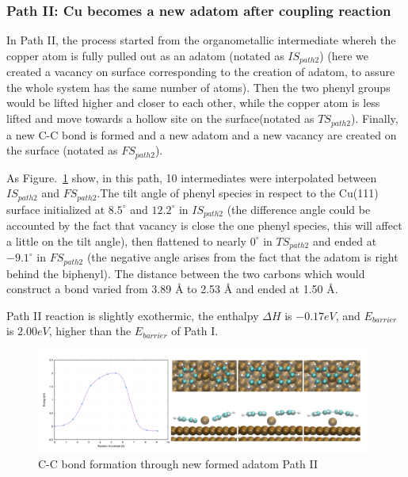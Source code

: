 \documentclass[aps,reprint,amsmath,amssymb]{revtex4-2}
\begin{document}
\subsubsection{Path II: Cu becomes a new adatom after coupling reaction}

In Path II, the process started from the organometallic intermediate whereh the copper atom is fully pulled out as an adatom (notated as $IS_{path2}$) (here we created a vacancy on surface corresponding to the creation of adatom, to assure the whole system has the same number of atoms). Then the two phenyl groups would be lifted higher and closer to each other, while the copper atom is less lifted and move towards a hollow site on the surface(notated as $TS_{path2}$). Finally, a new C-C bond is formed and a new adatom and a new vacancy are created on the surface (notated as $FS_{path2}$).

As Figure.~\ref{fig:bondformadatom} show, in this path, 10 intermediates were interpolated between $IS_{path2}$ and $FS_{path2}$.The tilt angle of phenyl species in respect to the Cu(111) surface initialized at $8.5^\circ$ and $12.2^\circ$ in $IS_{path2}$ (the difference angle could be accounted by the fact that vacancy is close the one phenyl species, this will affect a little on the tilt angle), then flattened to nearly $0^\circ$ in $TS_{path2}$ and ended at $-9.1^\circ$ in $FS_{path2}$ (the negative angle arises from the fact that the adatom is right behind the biphenyl). The distance between the two carbons which would construct a bond varied from 3.89 \si{\angstrom} to 2.53 \si{\angstrom} and ended at 1.50 \si{\angstrom}.

Path II reaction is slightly exothermic, the enthalpy $\Delta H$ is $-0.17 eV$, and $E_{barrier}$ is $2.00 eV$, higher than the $E_{barrier}$ of Path I.

\begin{figure}[ht]
\centering
\includegraphics[width=0.98\textwidth]{Fig/bondformadatom.png}
\caption{C-C bond formation through new formed adatom Path II}
\label{fig:bondformadatom}
\end{figure}
\end{document}
